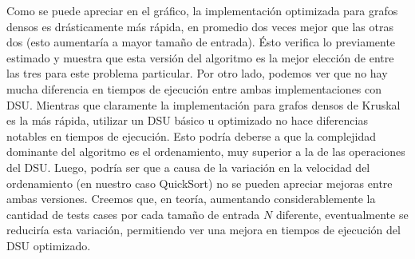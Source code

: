 
\vspace{1em}
Como se puede apreciar en el gráfico, la implementación optimizada para grafos densos es drásticamente más rápida, en promedio dos veces mejor que las otras dos (esto aumentaría a mayor tamaño de entrada). Ésto verifica lo previamente estimado y muestra que esta versión del algoritmo es la mejor elección de entre las tres para este problema particular. Por otro lado, podemos ver que no hay mucha diferencia en tiempos de ejecución entre ambas implementaciones con DSU. Mientras que claramente la implementación para grafos densos de Kruskal es la más rápida, utilizar un DSU básico u optimizado no hace diferencias notables en tiempos de ejecución. Esto podría deberse a que la complejidad dominante del algoritmo es el ordenamiento, muy superior a la de las operaciones del DSU. Luego, podría ser que a causa de la variación en la velocidad del ordenamiento (en nuestro caso QuickSort) no se pueden apreciar mejoras entre ambas versiones. Creemos que, en teoría, aumentando considerablemente la cantidad de tests cases por cada tamaño de entrada $N$ diferente, eventualmente se reduciría esta variación, permitiendo ver una mejora en tiempos de ejecución del DSU optimizado. 